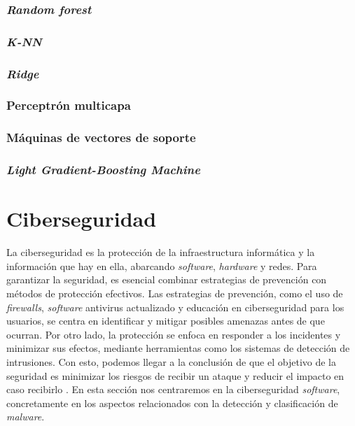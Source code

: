 
\subsubsection{\textit{Random forest}}
\label{subsubsec:randomforest}


\subsubsection{\textit{K-NN}}
\label{subsubsec:kneighbors}


\subsubsection{\textit{Ridge}}
\label{subsubsec:ridge}


\subsubsection{Perceptrón multicapa}
\label{subsubsec:mlp}


\subsubsection{Máquinas de vectores de soporte}
\label{subsubsec:svm}


\subsubsection{\textit{Light Gradient-Boosting Machine}}
\label{subsubsec:lgbm}


\section{Ciberseguridad}
\label{sec:ciberseguridad}

La ciberseguridad es la protección de la infraestructura informática y la información que hay en ella, abarcando \textit{software}, \textit{hardware} y redes. Para garantizar la seguridad, es esencial combinar estrategias de prevención con métodos de protección efectivos. Las estrategias de prevención, como el uso de \textit{firewalls}, \textit{software} antivirus actualizado y educación en ciberseguridad para los usuarios, se centra en identificar y mitigar posibles amenazas antes de que ocurran. Por otro lado, la protección se enfoca en responder a los incidentes y minimizar sus efectos, mediante herramientas como los sistemas de detección de intrusiones. Con esto, podemos llegar a la conclusión de que el objetivo de la seguridad es minimizar los riesgos de recibir un ataque y reducir el impacto en caso recibirlo \cite{ciberseguridad_def}. En esta sección nos centraremos en la ciberseguridad \textit{software}, concretamente en los aspectos relacionados con la detección y clasificación de \textit{malware}.

